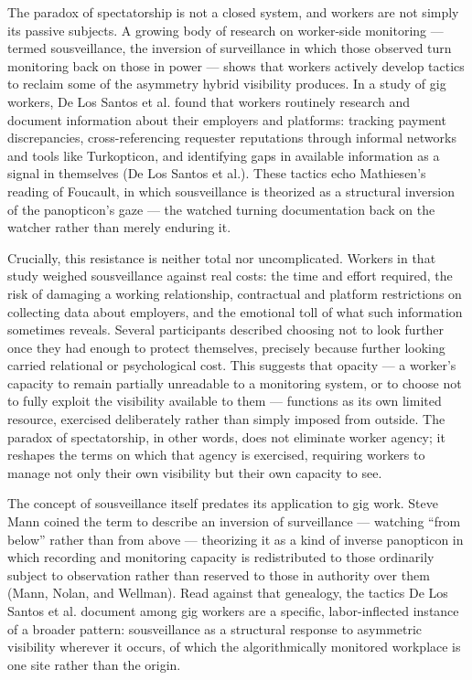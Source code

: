 \documentclass[12pt]{article}
\begin{document}
The paradox of spectatorship is not a closed system, and workers are not simply its passive subjects. A growing body of research on worker-side monitoring --- termed sousveillance, the inversion of surveillance in which those observed turn monitoring back on those in power --- shows that workers actively develop tactics to reclaim some of the asymmetry hybrid visibility produces. In a study of gig workers, De Los Santos et al. found that workers routinely research and document information about their employers and platforms: tracking payment discrepancies, cross-referencing requester reputations through informal networks and tools like Turkopticon, and identifying gaps in available information as a signal in themselves (De Los Santos et al.). These tactics echo Mathiesen's reading of Foucault, in which sousveillance is theorized as a structural inversion of the panopticon's gaze --- the watched turning documentation back on the watcher rather than merely enduring it.

Crucially, this resistance is neither total nor uncomplicated. Workers in that study weighed sousveillance against real costs: the time and effort required, the risk of damaging a working relationship, contractual and platform restrictions on collecting data about employers, and the emotional toll of what such information sometimes reveals. Several participants described choosing not to look further once they had enough to protect themselves, precisely because further looking carried relational or psychological cost. This suggests that opacity --- a worker's capacity to remain partially unreadable to a monitoring system, or to choose not to fully exploit the visibility available to them --- functions as its own limited resource, exercised deliberately rather than simply imposed from outside. The paradox of spectatorship, in other words, does not eliminate worker agency; it reshapes the terms on which that agency is exercised, requiring workers to manage not only their own visibility but their own capacity to see.

The concept of sousveillance itself predates its application to gig work. Steve Mann coined the term to describe an inversion of surveillance --- watching ``from below'' rather than from above --- theorizing it as a kind of inverse panopticon in which recording and monitoring capacity is redistributed to those ordinarily subject to observation rather than reserved to those in authority over them (Mann, Nolan, and Wellman). Read against that genealogy, the tactics De Los Santos et al. document among gig workers are a specific, labor-inflected instance of a broader pattern: sousveillance as a structural response to asymmetric visibility wherever it occurs, of which the algorithmically monitored workplace is one site rather than the origin.
\end{document}

